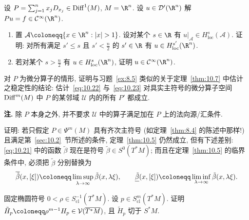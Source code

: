 \begin{exer}[一个径向向量场]\label{ex:10.7}
设 $P = \sum_{j=1}^{n} x_j D_{x_j} \in \operatorname{Diff}^1(M)$, $M = \R^n$. 设 $u \in \mathcal{D}'(\R^n)$ 解 $P u = f \in \Smooth(\R^n)$.
\begin{enumerate}
    \item 置 $\mathcal{A} \defeq \{x \in \R^n : |x| > 1\}$. 设对某个 $s \in \R$ 有 $u|_{\mathcal{A}} \in H_{\mathrm{loc}}^s(\mathcal{A})$. 证明: 对所有满足 $s' \le s$ 且 $s' < \frac{n}{2}$ 的 $s' \in \R$ 有 $u \in H_{\mathrm{loc}}^{s'}(\R^n)$.
    \item 若对某个 $s > \frac{n}{2}$ 有 $u \in H_{\mathrm{loc}}^s(\R^n)$, 证明 $u \in \Smooth(\R^n)$.
\end{enumerate}
\end{exer}

\begin{exer}[径向点估计的稳定性]\label{ex:10.8}
对 $P$ 为微分算子的情形, 证明与习题~\ref{ex:8.5} 类似的关于定理~\ref{thm:10.7} 中估计之稳定性的结论: 估计~\eqref{eq:10.22} 与~\eqref{eq:10.23} 对具实主符号的微分算子空间 $\operatorname{Diff}^m(M)$ 中 $P$ 的某邻域 $\mathcal{U}$ 内的所有 $P'$ 都成立.

\textbf{注.} 除 $P$ 本身之外, 并不要求 $\mathcal{U}$ 中的算子满足加在 $P$ 上的法向源/汇条件.
\end{exer}

\begin{exer}[非经典算子]\label{ex:10.9}
证明: 若只假定 $P \in \Psi^m(M)$ 具有齐次主符号 (如定理~\ref{thm:8.4} 的陈述中那样!) 且满足第~\ref{sec:10.2}~节所述的条件, 定理~\ref{thm:10.5} 仍然成立, 但有下述差别: \eqref{eq:10.21} 中的函数 $\tilde{\beta}$ 现在是符号 $\tilde{\beta} \in S^0(T^* M)$; 而且在定理~\ref{thm:10.5} 的临界条件中, 必须把 $\tilde{\beta}$ 分别替换为
\[
    \overline{\tilde{\beta}}(x, [\xi]) \defeq \limsup_{\lambda \to \infty} \tilde{\beta}(x, \lambda\xi), \qquad
    \underline{\tilde{\beta}}(x, [\xi]) \defeq \liminf_{\lambda \to \infty} \tilde{\beta}(x, \lambda\xi).
\]
\end{exer}

\begin{exer}\label{ex:10.10}
固定椭圆符号 $0 < \rho \in S_{\mathrm{cl}}^{-1}(T^* M)$. 设 $p \in S_{\mathrm{cl}}^m(T^* M)$. 证明 $\tilde{H}_p \defeq \rho^{m-1}H_p \in \mathcal{V}(\overline{T^* M})$, 且 $\tilde{H}_p$ 切于 $S^* M$.
\end{exer}

